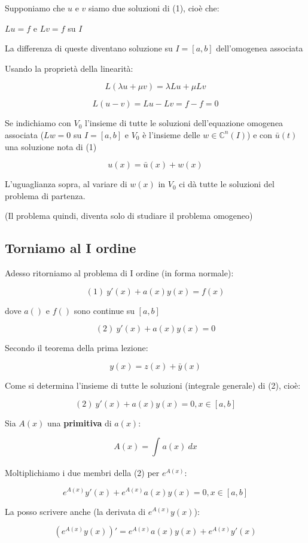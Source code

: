 \documentclass[11pt]{article}
\begin{document}
Supponiamo che $u$ e $v$ siamo due soluzioni di (1), cioè che:

$Lu=f$ e $Lv=f$ su $I$

La differenza di queste diventano soluzione su $I=[a,b]$ dell'omogenea associata

Usando la proprietà della linearità:

\[
    L(\lambda u+\mu v) = \lambda L u + \mu L v
\]

\[
    L(u-v) = Lu-Lv = f- f=0
\]

Se indichiamo con $V_0$ l'insieme di tutte le soluzioni dell'equazione omogenea associata ($Lw=0$ su $I=[a,b]$ e $V_0$ è l'insieme delle $w \in \mathbb{C}^n(I)$) e con $\bar u(t)$ una soluzione nota di (1)

\[
    u(x) = \bar u(x) +w(x)
\]

L'uguaglianza sopra, al variare di $w(x)$ in $V_0$ ci dà tutte le soluzioni del problema di partenza. 

(Il problema quindi, diventa solo di studiare il problema omogeneo)

\subsection{Torniamo al I ordine}

Adesso ritorniamo al problema di I ordine (in forma normale):

\[
    (1)\ y'(x)+a(x)y(x)=f(x)
\]

dove $a()$ e $f()$ sono continue su $[a,b]$

\[
    (2)\ y'(x)+a(x)y(x)=0
\]

Secondo il teorema della prima lezione:

\[
    y(x)=z(x)+\bar y(x)
\]

Come si determina l'insieme di tutte le soluzioni (integrale generale) di (2), cioè:

\[
    (2)\ y'(x)+a(x)y(x)=0,x \in [a,b]
\]

Sia $A(x)$ una \textbf{primitiva} di $a(x)$:

\[
    A(x) = \int_{{}}^{{}} {a(x)} \: d{x} {}
\]

Moltiplichiamo i due membri della (2) per $e^{A(x)}$:

\[
    e^{A(x)} y'(x) + e ^{A(x)}a(x) y(x)=0, x \in [a,b]
\]

La posso scrivere anche (la derivata di $e ^{A(x)}y(x)$):

\[
    (e ^{A(x)} y(x))' = e ^{A(x)}a(x)y(x) + e ^{A(x)}y'(x)
\]
\end{document}
